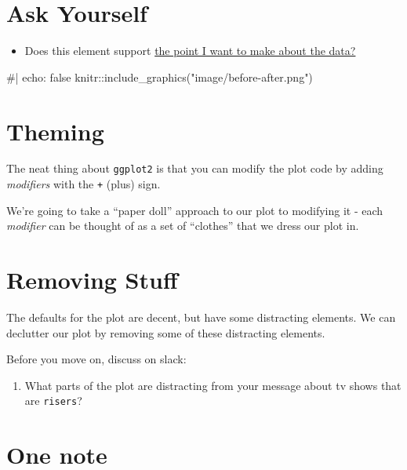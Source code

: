 \documentclass[
  letterpaper,
  DIV=11,
  numbers=noendperiod]{scrreprt}
\newenvironment{Shaded}{\begin{snugshade}}{\end{snugshade}}
\newcommand{\NormalTok}[1]{\textcolor[rgb]{0.00,0.23,0.31}{#1}}
\providecommand{\tightlist}{%
  \setlength{\itemsep}{0pt}\setlength{\parskip}{0pt}}\usepackage{longtable,booktabs,array}
\begin{document}
\section{Ask Yourself}\label{ask-yourself}

\begin{itemize}
\tightlist
\item
  Does this element support
  \href{http://www.storytellingwithdata.com/blog/2017/3/29/declutter-this-graph}{the
  point I want to make about the data?}
\end{itemize}

\begin{Shaded}
\begin{Highlighting}[]
\NormalTok{\#| echo: false}
\NormalTok{knitr::include\_graphics("image/before{-}after.png")}
\end{Highlighting}
\end{Shaded}

\section{Theming}\label{theming}

The neat thing about \texttt{ggplot2} is that you can modify the plot
code by adding \emph{modifiers} with the \texttt{+} (plus) sign.

We're going to take a ``paper doll'' approach to our plot to modifying
it - each \emph{modifier} can be thought of as a set of ``clothes'' that
we dress our plot in.

\section{Removing Stuff}\label{removing-stuff}

The defaults for the plot are decent, but have some distracting
elements. We can declutter our plot by removing some of these
distracting elements.

Before you move on, discuss on slack:

\begin{enumerate}
\def\labelenumi{\arabic{enumi})}
\tightlist
\item
  What parts of the plot are distracting from your message about tv
  shows that are \texttt{risers}?
\end{enumerate}

\section{One note}\label{one-note}
\end{document}
